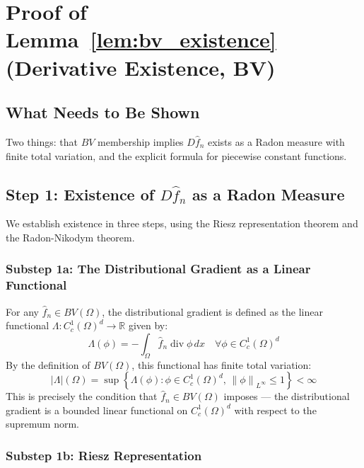\documentclass[12pt,a4paper]{article}
\numberwithin{equation}{section}
\theoremstyle{plain}
\theoremstyle{definition}
\newcommand{\norm}[1]{\left\| #1 \right\|}
\newcommand{\R}{\mathbb{R}}
\newcommand{\BV}{BV(\Omega)}
\newcommand{\fn}{\hat{f}_n}
\begin{document}
	\section{Proof of Lemma~\ref{lem:bv_existence}
		(Derivative Existence, BV)}
	\label{app:lem_bv_existence}
	
	\subsection{What Needs to Be Shown}
	
	Two things: that $BV$ membership implies $D\fn$ exists as a Radon measure
	with finite total variation, and the explicit formula for piecewise constant
	functions.
	
	\subsection{Step 1: Existence of $D\fn$ as a Radon Measure}
	
	We establish existence in three steps, using the Riesz representation
	theorem and the Radon-Nikodym theorem.
	
	\subsubsection*{Substep 1a: The Distributional Gradient as a Linear Functional}
	
	For any $\fn \in \BV$, the distributional gradient is defined as the linear
	functional $\Lambda: C_c^1(\Omega)^d \to \R$ given by:
	\begin{equation}
		\Lambda(\phi) = -\int_\Omega \fn \operatorname{div} \phi \, dx
		\quad \forall \phi \in C_c^1(\Omega)^d
	\end{equation}
	By the definition of $\BV$, this functional has finite total variation:
	\begin{equation}
		|\Lambda|(\Omega)
		= \sup\left\{
		\Lambda(\phi) : \phi \in C_c^1(\Omega)^d,\, \norm{\phi}_{L^\infty} \leq 1
		\right\}
		< \infty
	\end{equation}
	This is precisely the condition that $\fn \in \BV$ imposes --- the
	distributional gradient is a bounded linear functional on $C_c^1(\Omega)^d$
	with respect to the supremum norm.
	
	\subsubsection*{Substep 1b: Riesz Representation}
	
\end{document}
